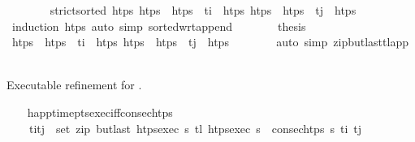 \begin{isabellebody}
\ \ \ \ \ \ \isamarkupfalse%
\ {\isacartoucheopen}strict{\isacharunderscore}{\kern0pt}sorted\ htps{\isacartoucheclose}\ {\isacartoucheopen}htps\ {\isacharequal}{\kern0pt}\ htps\ {\isacharat}{\kern0pt}\ t\isactrlsub i\ {\isacharhash}{\kern0pt}\ htps\ {\isacartoucheopen}htps\ {\isacharequal}{\kern0pt}\ htps\ {\isacharat}{\kern0pt}\ t\isactrlsub j\ {\isacharhash}{\kern0pt}\ htps\isanewline
\ \ \ \ \ \ \isamarkupfalse%
\ {\isacharparenleft}{\kern0pt}induction\ htps\ {\isacharparenleft}{\kern0pt}auto\ simp{\isacharcolon}{\kern0pt}\ sorted{\isacharunderscore}{\kern0pt}wrt{\isacharunderscore}{\kern0pt}append{\isacharparenright}{\kern0pt}\isanewline
\ \ \ \ \isamarkupfalse%
\ \isamarkupfalse%
\ {\isacharquery}{\kern0pt}thesis\isanewline
\ \ \ \ \ \ \isamarkupfalse%
\ {\isacartoucheopen}htps\ {\isacharequal}{\kern0pt}\ htps\ {\isacharat}{\kern0pt}\ t\isactrlsub i\ {\isacharhash}{\kern0pt}\ htps\ {\isacartoucheopen}htps\ {\isacharequal}{\kern0pt}\ htps\ {\isacharat}{\kern0pt}\ t\isactrlsub j\ {\isacharhash}{\kern0pt}\ htps\isanewline
\ \ \ \ \ \ \isamarkupfalse%
\ {\isacharparenleft}{\kern0pt}auto\ simp{\isacharcolon}{\kern0pt}\ zip{\isacharunderscore}{\kern0pt}butlast{\isacharunderscore}{\kern0pt}tl{\isacharunderscore}{\kern0pt}app{}{\isacharparenright}{\kern0pt}\isanewline
\ \ \isamarkupfalse%
%
\endisatagproof
{\isafoldproof}%
%
\isadelimproof
%
\endisadelimproof
%
\begin{isamarkuptext}%
Executable refinement for .%
\end{isamarkuptext}\isamarkuptrue%
\ \ \isamarkupfalse%
\ happ{\isacharunderscore}{\kern0pt}time{\isacharunderscore}{\kern0pt}pts{\isacharunderscore}{\kern0pt}exec{\isacharunderscore}{\kern0pt}iff{\isacharunderscore}{\kern0pt}consec{\isacharunderscore}{\kern0pt}htps{\isacharcolon}{\kern0pt}\isanewline
\ \ \ \ {\isachardoublequoteopen}{\isacharparenleft}{\kern0pt}t\isactrlsub i{\isacharcomma}{\kern0pt}t\isactrlsub j{\isacharparenright}{\kern0pt}\ {\isasymin}\ set\ {\isacharparenleft}{\kern0pt}zip\ {\isacharparenleft}{\kern0pt}butlast\ {\isacharparenleft}{\kern0pt}htps{\isacharunderscore}{\kern0pt}exec\ {\isasympi}s{\isacharparenright}{\kern0pt}{\isacharparenright}{\kern0pt}\ {\isacharparenleft}{\kern0pt}tl\ {\isacharparenleft}{\kern0pt}htps{\isacharunderscore}{\kern0pt}exec\ {\isasympi}s{\isacharparenright}{\kern0pt}{\isacharparenright}{\kern0pt}{\isacharparenright}{\kern0pt}\ {\isasymlongleftrightarrow}\ consec{\isacharunderscore}{\kern0pt}htps\ {\isasympi}s\ t\isactrlsub i\ t\isactrlsub j{\isachardoublequoteclose}\isanewline

\end{isabellebody}
